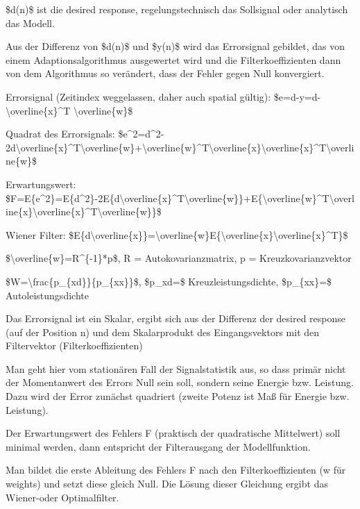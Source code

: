 \documentclass[a4paper]{article}
\begin{document}
\begin{multicols}{3}
\begin{itemize*}
    \item \$d(n)\$ ist die desired response, regelungstechnisch das Sollsignal oder analytisch das Modell.
    \item Aus der Differenz von \$d(n)\$ und \$y(n)\$ wird das Errorsignal gebildet, das von einem Adaptionsalgorithmus ausgewertet wird und die Filterkoeffizienten dann von dem Algorithmus so verändert, dass der Fehler gegen Null konvergiert.
    \item Errorsignal (Zeitindex weggelassen, daher auch spatial gültig): \$e=d-y=d-\textbackslash overline\{x\}\^{}T \textbackslash overline\{w\}\$
    \item Quadrat des Errorsignals: \$e\^{}2=d\^{}2-2d\textbackslash overline\{x\}\^{}T\textbackslash overline\{w\}+\textbackslash overline\{w\}\^{}T\textbackslash overline\{x\}\textbackslash overline\{x\}\^{}T\textbackslash overline\{w\}\$
    \item Erwartungswert: \$F=E\{e\^{}2\}=E\{d\^{}2\}-2E\{d\textbackslash overline\{x\}\^{}T\textbackslash overline\{w\}\}+E\{\textbackslash overline\{w\}\^{}T\textbackslash overline\{x\}\textbackslash overline\{x\}\^{}T\textbackslash overline\{w\}\}\$
    \item Wiener Filter: \$E\{d\textbackslash overline\{x\}\}=\textbackslash overline\{w\}E\{\textbackslash overline\{x\}\textbackslash overline\{x\}\^{}T\}\$
    \begin{itemize*}
      \item \$\textbackslash overline\{w\}=R\^{}\{-1\}*p\$, R = Autokovarianzmatrix, p = Kreuzkovarianzvektor
      \item \$W=\textbackslash frac\{p\_\{xd\}\}\{p\_\{xx\}\}\$, \$p\_xd=\$ Kreuzleistungsdichte, \$p\_\{xx\}=\$ Autoleistungsdichte
    \end{itemize*}
    \item Das Errorsignal ist ein Skalar, ergibt sich aus der Differenz der desired response (auf der Position n) und dem Skalarprodukt des Eingangsvektors mit den Filtervektor (Filterkoeffizienten)
    \item Man geht hier vom stationären Fall der Signalstatistik aus, so dass primär nicht der Momentanwert des Errors Null sein soll, sondern seine Energie bzw. Leistung. Dazu wird der Error zunächst quadriert (zweite Potenz ist Maß für Energie bzw. Leistung).
    \item Der Erwartungswert des Fehlers F (praktisch der quadratische Mittelwert) soll minimal werden, dann entspricht der Filterausgang der Modellfunktion.
    \item Man bildet die erste Ableitung des Fehlers F nach den Filterkoeffizienten (w für weights) und setzt diese gleich Null. Die Lösung dieser Gleichung ergibt das Wiener-oder Optimalfilter.

\end{itemize*}
\end{multicols}
\end{document}
